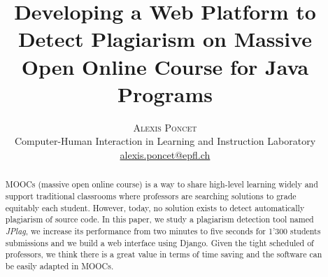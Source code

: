 \documentclass[twoside]{article}
\title{\vspace{-15mm}\fontsize{18pt}{10pt}\selectfont\textbf{Developing a Web Platform to Detect Plagiarism on Massive Open Online Course for Java Programs}}
\author{
\large
\textsc{Alexis Poncet\vspace{2mm}} \\
\normalsize Computer-Human Interaction in Learning and Instruction Laboratory \\ 
\normalsize \href{mailto:alexis.poncet@epfl.ch}{alexis.poncet@epfl.ch} 
\vspace{-5mm}
}
\date{}
\begin{document}
\maketitle %

\thispagestyle{fancy} %


\vspace{0.9cm}
\begin{abstract}

MOOCs (massive open online course) is a way to share high-level learning widely and support traditional classrooms where professors are searching solutions to grade equitably each student. However, today, no solution exists to detect automatically plagiarism of source code. In this paper, we study a plagiarism detection tool named \textit{JPlag}, we increase its performance from two minutes to five seconds for 1'300 students submissions and we build a web interface using Django. Given the tight scheduled of professors, we think there is a great value in terms of time saving and the software can be easily adapted in MOOCs.
\vspace{0.5cm}
\end{abstract}

\end{document}
